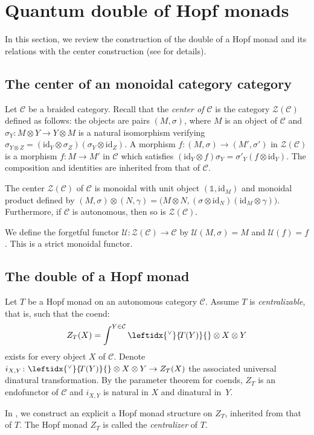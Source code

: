 \documentclass[a4paper]{amsart}
\theoremstyle{definition}
\newcommand{\co}{\colon}
\newcommand{\id}{\mathrm{id}}
\newcommand{\cc}{\mathcal{C}}
\newcommand{\uu}{\mathcal{U}}
\newcommand{\zz}{\mathcal{Z}}
\newcommand{\un}{\mathbb{1}}
\newcommand{\ldual}[1]{\leftidx{^\vee}{\!#1}{}}
\begin{document}
\section{Quantum double of Hopf monads}\label{Sect-thedouble}
In this section, we review the construction of the double of a Hopf monad and its relations with the center construction
(see \cite{BV3} for details).

\subsection{The center of an monoidal category category}\label{sect-centerDr} Let $\cc$ be a braided category.
Recall that the \emph{center of $\cc$} is the category $\zz(\cc)$ defined as follows: the objects are pairs $(M,\sigma)$,
where $M$ is an object of $\cc$ and $\sigma_Y\co M \otimes Y \to Y \otimes M$ is a natural isomorphism verifying $\sigma_{Y
\otimes Z} =(\id_{Y} \otimes \sigma_Z)(\sigma_Y \otimes \id_{Z})$. A morphism $f \co (M,\sigma) \to (M',\sigma')$ in
$\zz(\cc)$ is a morphism $f\co M \to M'$ in $\cc$ which satisfies $(\id_{Y} \otimes f) \sigma_Y=\sigma'_Y(f \otimes \id_Y)$.
The composition and identities are inherited from that of $\cc$.

The center  $\zz(\cc)$ of $\cc$ is monoidal  with unit object $(\un,\id_M )$ and monoidal product defined by $ (M,\sigma)
\otimes (N,\gamma)=\bigl (M \otimes N,(\sigma \otimes \id_N)(\id_M \otimes \gamma)\bigr)$. Furthermore, if $\cc$ is
autonomous, then so is $\zz(\cc)$.

We define the forgetful functor $\uu\co \zz(\cc) \to \cc$ by $\uu(M,\sigma)=M$ and $\uu(f)=f$. This is a strict monoidal
functor.

\subsection{The double of a Hopf monad}
Let $T$ be a Hopf monad on an autonomous category $\cc$. Assume $T$ is \emph{centralizable}, that is, such that the coend:
\begin{equation*}
Z_T(X)=\int^{Y \in \cc} \ldual{T(Y)} \otimes X \otimes Y
\end{equation*}
exists for every object $X$ of $\cc$. Denote $i_{X,Y} \co \ldual{T(Y)} \otimes X \otimes Y \to Z_T(X)$ the associated
universal dinatural transformation. By the parameter theorem for coends, $Z_T$ is an endofunctor of $\cc$ and $i_{X,Y}$ is
natural in $X$ and dinatural in~$Y$.

In \cite{BV3}, we construct an explicit a Hopf monad structure on $Z_T$, inherited from that of $T$. The Hopf monad $Z_T$ is
called the \emph{centralizer} of $T$.
\end{document}
